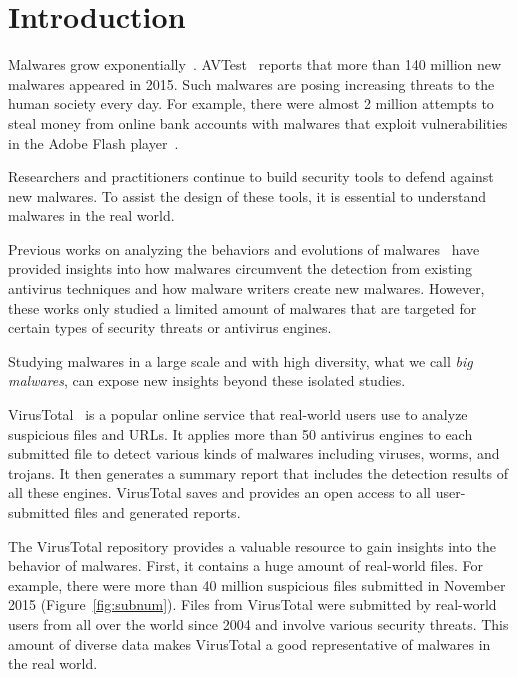 
\section{Introduction}

Malwares grow exponentially~\cite{avtest}. 
AVTest~\cite{avtest} reports that more than 140 million new malwares appeared in 2015. 
Such malwares are posing increasing threats to the human society every day. 
For example, there were almost 2 million attempts to 
steal money from online bank accounts 
with malwares that exploit vulnerabilities in the Adobe Flash player~\cite{kaspersky}. 

Researchers and practitioners continue to build security tools to defend against new malwares.
To assist the design of these tools, it is essential to understand malwares in the real world. 

Previous works on analyzing the behaviors and evolutions of malwares~\cite{ZhouSP2012,GuptaComsnets2009} 
have provided insights 
into how malwares circumvent the detection from existing antivirus techniques and how malware writers create new malwares. 
However, these works only studied a limited amount of malwares that are targeted for certain types of security threats or antivirus engines.

Studying malwares in a large scale and with high diversity, what we call {\em big malwares}, 
can expose new insights beyond these isolated studies.

VirusTotal~\cite{virustotal} is a popular online service that real-world users use to analyze suspicious files and URLs.
It applies more than 50 antivirus engines to each submitted file 
to detect various kinds of malwares including viruses, worms, and trojans. 
It then generates a summary report that includes the detection results of all these engines. 
VirusTotal saves and provides an open access to all user-submitted files and generated reports. 

The VirusTotal repository provides a valuable resource to gain insights into 
the behavior of malwares.
%
First, it contains a huge amount of real-world files.
For example, there were more than 40 million suspicious files submitted in November 2015 (Figure~\ref{fig:subnum}). 
Files from VirusTotal were submitted by real-world users from all over the world since 2004
and involve various security threats. 
This amount of diverse data makes VirusTotal a good representative of malwares in the real world. 

